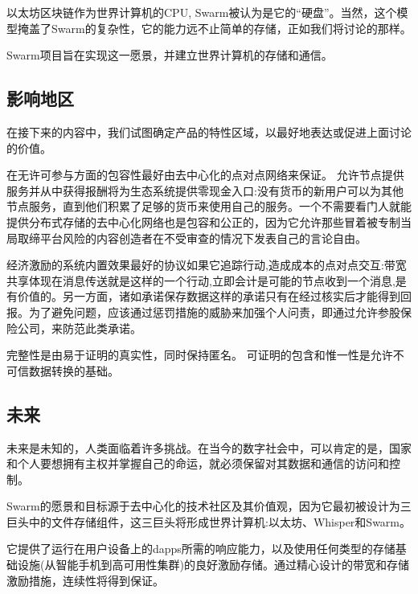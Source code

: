  
以太坊区块链作为世界计算机的CPU, Swarm被认为是它的“硬盘”。当然，这个模型掩盖了Swarm的复杂性，它的能力远不止简单的存储，正如我们将讨论的那样。

Swarm项目旨在实现这一愿景，并建立世界计算机的存储和通信。 

\subsection{影响地区\statusorange}

在接下来的内容中，我们试图确定产品的特性区域，以最好地表达或促进上面讨论的价值。

在无许可参与方面的包容性最好由去中心化的点对点网络来保证。
允许节点提供服务并从中获得报酬将为生态系统提供零现金入口:没有货币的新用户可以为其他节点服务，直到他们积累了足够的货币来使用自己的服务。一个不需要看门人就能提供分布式存储的去中心化网络也是包容和公正的，因为它允许那些冒着被专制当局取缔平台风险的内容创造者在不受审查的情况下发表自己的言论自由。

经济激励的系统内置效果最好的协议如果它追踪行动,造成成本的点对点交互:带宽共享体现在消息传送就是这样的一个行动,立即会计是可能的节点收到一个消息,是有价值的。另一方面，诸如承诺保存数据这样的承诺只有在经过核实后才能得到回报。为了避免问题，应该通过惩罚措施的威胁来加强个人问责，即通过允许参股保险公司，来防范此类承诺。

完整性是由易于证明的真实性，同时保持匿名。
可证明的包含和惟一性是允许不可信数据转换的基础。


\subsection{未来} \label{sec:future}

未来是未知的，人类面临着许多挑战。在当今的数字社会中，可以肯定的是，国家和个人要想拥有主权并掌握自己的命运，就必须保留对其数据和通信的访问和控制。

Swarm的愿景和目标源于去中心化的技术社区及其价值观，因为它最初被设计为三巨头中的文件存储组件，这三巨头将形成世界计算机:以太坊、Whisper和Swarm。

它提供了运行在用户设备上的dapps所需的响应能力，以及使用任何类型的存储基础设施(从智能手机到高可用性集群)的良好激励存储。通过精心设计的带宽和存储激励措施，连续性将得到保证。

